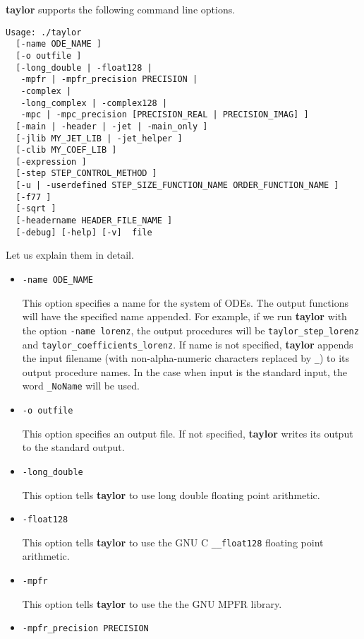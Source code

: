 \documentclass[10pt]{article}
\theoremstyle{remark}
\newcommand{\taylorname}{{\bf taylor}}
\begin{document}
\taylorname{} supports the following command line options.
\begin{verbatim}
Usage: ./taylor 
  [-name ODE_NAME ]
  [-o outfile ]
  [-long_double | -float128 |
   -mpfr | -mpfr_precision PRECISION |
   -complex |
   -long_complex | -complex128 |
   -mpc | -mpc_precision [PRECISION_REAL | PRECISION_IMAG] ]
  [-main | -header | -jet | -main_only ]
  [-jlib MY_JET_LIB | -jet_helper ]
  [-clib MY_COEF_LIB ]
  [-expression ]
  [-step STEP_CONTROL_METHOD ]
  [-u | -userdefined STEP_SIZE_FUNCTION_NAME ORDER_FUNCTION_NAME ]
  [-f77 ]
  [-sqrt ]
  [-headername HEADER_FILE_NAME ]
  [-debug] [-help] [-v]  file
\end{verbatim}

Let us explain them in detail.

\begin{itemize}
\item{ \verb+-name ODE_NAME+ 

This option specifies a name for the system of ODEs. The output
functions will have the specified name appended. For example, if we
run \taylorname{} with the option \verb+-name lorenz+, the output
procedures will be \verb+taylor_step_lorenz+ and
\verb+taylor_coefficients_lorenz+.  If name is not specified,
\taylorname{} appends the input filename (with non-alpha-numeric
characters replaced by \verb+_+) to its output procedure names. In the
case when input is the standard input, the word \verb+_NoName+ will be
used.}
\item{ \verb+-o outfile+ 

This option specifies an output file. If not specified, \taylorname{}
writes its output to the standard output.}

\noindent

\item{\verb+-long_double+

This option tells \taylorname{} to use long double
floating point arithmetic.  }

\item{\verb+-float128+

This option tells \taylorname{} to use the GNU C \verb+__float128+
floating point arithmetic.  }

\item{\verb+-mpfr+ 

This option tells \taylorname{} to use the the GNU MPFR library.  }

\item{\verb+-mpfr_precision PRECISION+

}
\end{itemize}
\end{document}
